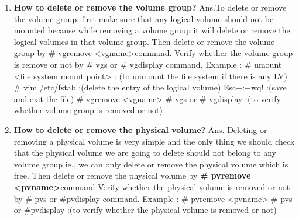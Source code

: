 \begin{enumerate}
\begin{enumerate}
    \bigskip
    \bigskip

    \item \textbf{How to delete or remove the volume group?}
    \newline
    Ans.To delete or remove the volume group, first make sure that any logical volume should not be mounted because while removing a volume group it will delete or remove the logical volumes in that volume group.
    Then delete or remove the volume group by # vgremove    <vgname>command.
    Verify whether the volume group is remove or not by # vgs    or    # vgdisplay   command.
    Example : 	# umount     <file system mount point>	:	(to unmount the file system if there is any LV)
			# vim   /etc/fstab 	:(delete the entry of the logical volume)
			Esc+:+wq!	:(save and exit the file)
			# vgremove     <vgname>
			# vgs     or     # vgdisplay :(to verify whether volume group is removed or not)

    \bigskip
    \bigskip

    \item \textbf{How to delete or remove the physical volume?}
    \newline
    Ans. Deleting or removing a physical volume is very simple and the only thing we should check that the physical volume we are going to delete should not belong to any volume group ie., we can only delete or remove the physical volume which is free.
    Then delete or remove the physical volume by \textbf{# pvremove    <pvname>}command Verify whether the physical volume is removed or not by # pvs    or     #pvdisplay    command.
	  Example :  # pvremove   <pvname>
			# pvs    or     #pvdisplay	:(to verify whether the physical volume is removed or not)
 
    \bigskip
    \bigskip


\end{enumerate}
\end{enumerate}
